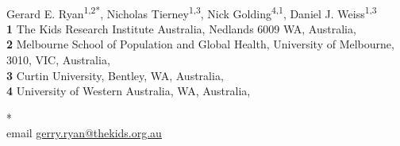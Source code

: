 \documentclass[
  10pt,
  letterpaper,
]{article}
\begin{document}
\vspace*{0.2in}

\begin{flushleft}
{\Large
\textbf{} %
}
\newline
\\
Gerard E. Ryan\textsuperscript{1,2*}, Nicholas
Tierney\textsuperscript{1,3}, Nick Golding\textsuperscript{4,1}, Daniel
J. Weiss\textsuperscript{1,3}
\\
\bigskip
\textbf{1} The Kids Research Institute Australia, Nedlands 6009 WA,
Australia, \\ \textbf{2} Melbourne School of Population and Global
Health, University of Melbourne, 3010, VIC,
Australia, \\ \textbf{3} Curtin University, Bentley, WA,
Australia, \\ \textbf{4} University of Western Australia, WA,
Australia, 
\bigskip

%
%





* \\ email \href{mailto:gerry.ryan@thekids.org.au}{gerry.ryan@thekids.org.au}

\end{flushleft}
\end{document}
